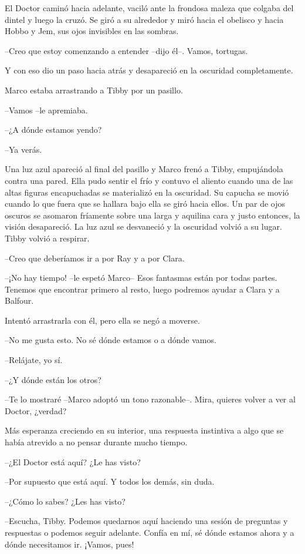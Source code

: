 {El Doctor caminó hacia adelante, vaciló ante la frondosa maleza que
 colgaba del dintel y luego la cruzó. Se giró a su alrededor y miró hacia
el obelisco y hacia Hobbo y Jem, sus ojos invisibles en las sombras.}

{--Creo que estoy comenzando a entender --dijo él--. Vamos, tortugas.}

{Y con eso dio un paso hacia atrás y desapareció en la oscuridad
 completamente.}

{Marco estaba arrastrando a Tibby por un
pasillo.}

{--Vamos --le apremiaba.}

{--¿A dónde estamos yendo?}

{--Ya verás.}

{Una luz azul apareció al final del pasillo y Marco frenó a Tibby,
 empujándola contra una pared. Ella pudo sentir el frío y contuvo el
 aliento cuando una de las altas figuras encapuchadas se materializó en
 la oscuridad. Su capucha se movió cuando lo que fuera que se hallara
 bajo ella se giró hacia ellos. Un par de ojos oscuros se asomaron
 fríamente sobre una larga y aquilina cara y justo entonces, la visión
 desapareció. La luz azul se desvaneció y la oscuridad volvió a su lugar.
Tibby volvió a respirar.}

{--Creo que deberíamos ir a por Ray y a por Clara.}

{--¡No hay tiempo! --le espetó Marco-- Esos fantasmas están por todas
 partes. Tenemos que encontrar primero al resto, luego podremos ayudar a
Clara y a Balfour.}

{Intentó arrastrarla con él, pero ella se negó a moverse.}

{--No me gusta esto. No sé dónde estamos o a dónde vamos.}

{--Relájate, yo sí.}

{--¿Y dónde están los otros?}

{--Te lo mostraré --Marco adoptó un tono razonable--. Mira, quieres
volver a ver al Doctor, ¿verdad?}

{Más esperanza creciendo en su interior, una respuesta instintiva a algo
que se había atrevido a no pensar durante mucho tiempo.}

{--¿El Doctor está aquí? ¿Le has visto?}

{--Por supuesto que está aquí. Y todos los demás, sin duda.}

{--¿Cómo lo sabes? ¿Les has visto?}

{--Escucha, Tibby. Podemos quedarnos aquí haciendo una sesión de
 preguntas y respuestas o podemos seguir adelante. Confía en mí, sé dónde
estamos ahora y a dónde necesitamos ir. ¡Vamos, pues!}

